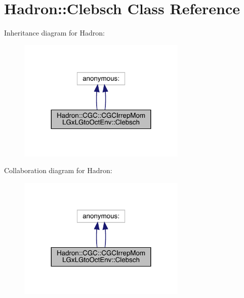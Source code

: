 \hypertarget{classHadron_1_1CGC_1_1CGCIrrepMomLGxLGtoOctEnv_1_1Clebsch}{}\section{Hadron\+:\+:Clebsch Class Reference}
\label{classHadron_1_1CGC_1_1CGCIrrepMomLGxLGtoOctEnv_1_1Clebsch}


Inheritance diagram for Hadron\+:
\nopagebreak
\begin{figure}[H]
\begin{center}
\leavevmode
\includegraphics[width=227pt]{d6/dfd/classHadron_1_1CGC_1_1CGCIrrepMomLGxLGtoOctEnv_1_1Clebsch__inherit__graph}
\end{center}
\end{figure}


Collaboration diagram for Hadron\+:
\nopagebreak
\begin{figure}[H]
\begin{center}
\leavevmode
\includegraphics[width=227pt]{d5/d06/classHadron_1_1CGC_1_1CGCIrrepMomLGxLGtoOctEnv_1_1Clebsch__coll__graph}
\end{center}
\end{figure}
